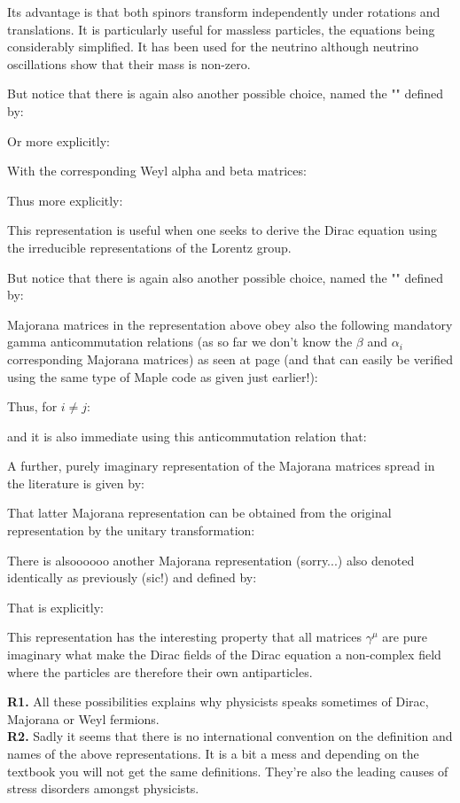 	Its advantage is that both spinors transform independently under rotations and translations. It is particularly useful for massless particles, the equations being considerably simplified. It has been used for the neutrino although neutrino oscillations show that their mass is non-zero.
	
	But notice that there is again also another possible choice, named the "" defined by:
	
	Or more explicitly:
	
	With the corresponding Weyl alpha and beta matrices:
	
	Thus more explicitly:
	
	This representation is useful when one seeks to derive the Dirac equation using the irreducible representations of the Lorentz group.
	
	But notice that there is again also another possible choice, named the "" defined by:
	
	Majorana matrices in the representation above obey also the following mandatory gamma anticommutation relations (as so far we don't know the $\beta$ and $\alpha_i$ corresponding Majorana matrices) as seen at page \pageref{gamma anticommutation relations} (and that can easily be verified using the same type of Maple code as given just earlier!):
	
	Thus, for $i\neq j$:
	
	and it is also immediate using this anticommutation relation that:
	
	A further, purely imaginary representation of the Majorana matrices spread in the literature is given by:
	
	That latter Majorana representation can be obtained from the original representation by the unitary transformation:
	
	There is alsoooooo another Majorana representation (sorry...) also denoted identically as previously (sic!) and defined by:
	
	That is explicitly:
	
	This representation has the interesting property that all matrices $\gamma^\mu$ are pure imaginary what make the Dirac fields of the Dirac equation a non-complex field where the particles are therefore their own antiparticles.
	\begin{tcolorbox}[title=Remarks,colframe=black,arc=10pt]
	\textbf{R1.} All these possibilities explains why physicists speaks sometimes of Dirac, Majorana or Weyl fermions.\\
	
	\textbf{R2.} Sadly it seems that there is no international convention on the definition and names of the above representations. It is a bit a mess and depending on the textbook you will not get the same definitions. They're also the leading causes of stress disorders amongst physicists.
	\end{tcolorbox}
	
